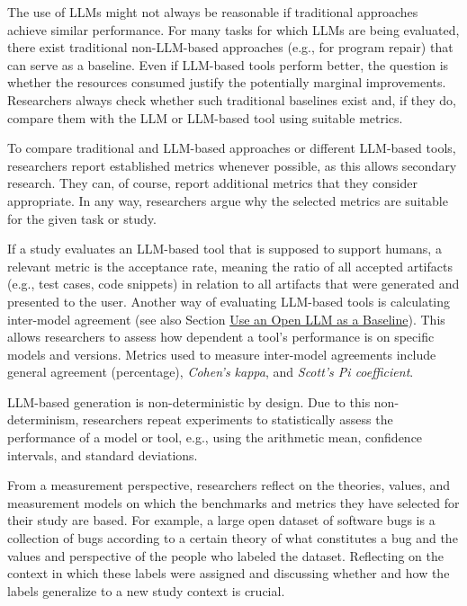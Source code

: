The use of LLMs might not always be reasonable if traditional approaches achieve similar performance. 
For many tasks for which LLMs are being evaluated, there exist traditional non-LLM-based approaches (e.g., for program repair) that can serve as a baseline.
Even if LLM-based tools perform better, the question is whether the resources consumed justify the potentially marginal improvements.
Researchers \should always check whether such traditional baselines exist and, if they do, compare them with the LLM or LLM-based tool using suitable metrics.

To compare traditional and LLM-based approaches or different LLM-based tools, researchers \should report established metrics whenever possible, as this allows secondary research.
They can, of course, report additional metrics that they consider appropriate.
In any way, researchers \must argue why the selected metrics are suitable for the given task or study. 

If a study evaluates an LLM-based tool that is supposed to support humans, a relevant metric is the acceptance rate, meaning the ratio of all accepted artifacts (e.g., test cases, code snippets) in relation to all artifacts that were generated and presented to the user.
Another way of evaluating LLM-based tools is calculating inter-model agreement (see also Section \href{/guidelines/#use-an-open-llm-as-a-baseline}{Use an Open LLM as a Baseline}).
This allows researchers to assess how dependent a tool's performance is on specific models and versions.
Metrics used to measure inter-model agreements include general agreement (percentage), \emph{Cohen's kappa}, and \emph{Scott's Pi coefficient}.

LLM-based generation is non-deterministic by design.
Due to this non-determinism, researchers \should repeat experiments to statistically assess the performance of a model or tool, e.g., using the arithmetic mean, confidence intervals, and standard deviations.

From a measurement perspective, researchers \should reflect on the theories, values, and measurement models on which the benchmarks and metrics they have selected for their study are based.
For example, a large open dataset of software bugs is a collection of bugs according to a certain theory of what constitutes a bug and the values and perspective of the people who labeled the dataset.
Reflecting on the context in which these labels were assigned and discussing whether and how the labels generalize to a new study context is crucial.


